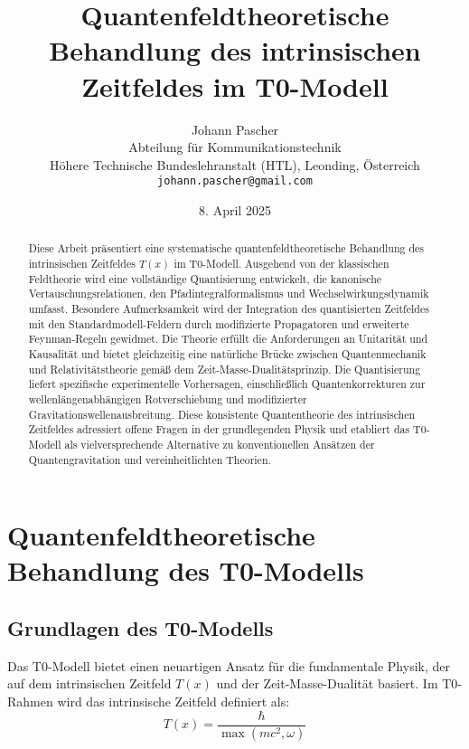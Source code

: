 \documentclass[12pt,a4paper]{article}
\title{Quantenfeldtheoretische Behandlung des intrinsischen Zeitfeldes im T0-Modell}
\author{Johann Pascher\\
	Abteilung für Kommunikationstechnik\\
	Höhere Technische Bundeslehranstalt (HTL), Leonding, Österreich\\
	\texttt{johann.pascher@gmail.com}}
\date{8. April 2025}
\newcommand{\Tfield}{T(x)}
\begin{document}
	
	\maketitle
	
	\begin{abstract}
		Diese Arbeit präsentiert eine systematische quantenfeldtheoretische Behandlung des intrinsischen Zeitfeldes $\Tfield$ im T0-Modell. Ausgehend von der klassischen Feldtheorie wird eine vollständige Quantisierung entwickelt, die kanonische Vertauschungsrelationen, den Pfadintegralformalismus und Wechselwirkungsdynamik umfasst. Besondere Aufmerksamkeit wird der Integration des quantisierten Zeitfeldes mit den Standardmodell-Feldern durch modifizierte Propagatoren und erweiterte Feynman-Regeln gewidmet. Die Theorie erfüllt die Anforderungen an Unitarität und Kausalität und bietet gleichzeitig eine natürliche Brücke zwischen Quantenmechanik und Relativitätstheorie gemäß dem Zeit-Masse-Dualitätsprinzip. Die Quantisierung liefert spezifische experimentelle Vorhersagen, einschließlich Quantenkorrekturen zur wellenlängenabhängigen Rotverschiebung und modifizierter Gravitationswellenausbreitung. Diese konsistente Quantentheorie des intrinsischen Zeitfeldes adressiert offene Fragen in der grundlegenden Physik und etabliert das T0-Modell als vielversprechende Alternative zu konventionellen Ansätzen der Quantengravitation und vereinheitlichten Theorien.
	\end{abstract}
	
	\tableofcontents
	\newpage
	
	\section{Quantenfeldtheoretische Behandlung des T0-Modells}
	\label{sec:qft_treatment}
	
	\subsection{Grundlagen des T0-Modells}
	\label{subsec:foundations}
	
	Das T0-Modell bietet einen neuartigen Ansatz für die fundamentale Physik, der auf dem intrinsischen Zeitfeld $T(x)$ und der Zeit-Masse-Dualität basiert. Im T0-Rahmen wird das intrinsische Zeitfeld definiert als:
	\begin{equation}
		T(x) = \frac{\hbar}{\max(mc^2, \omega)}
		\label{eq:intrinsic_time}
	\end{equation}
	
\end{document}

